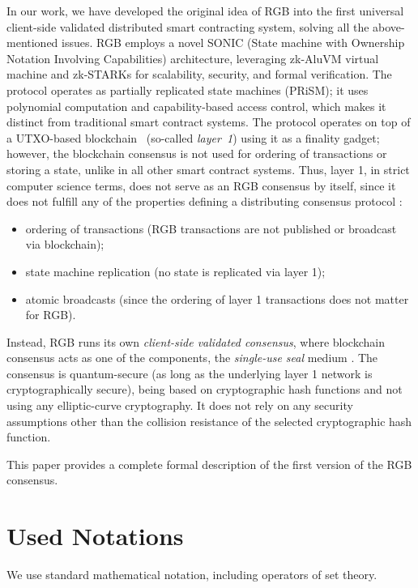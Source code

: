 \documentclass[9pt,oneside]{amsart}
\begin{document}
\begin{multicols}{2}
In our work, we have developed the original idea of RGB into the first universal
client-side validated distributed smart contracting system,
solving all the above-mentioned issues.
RGB employs a novel SONIC (State machine with Ownership Notation Involving Capabilities) architecture,
leveraging zk-AluVM virtual machine \cite{AluVM} and zk-STARKs \cite{zkSTARKs}
for scalability, security, and formal verification.
The protocol operates as partially replicated state machines (PRiSM);
it uses polynomial computation and capability-based access control,
which makes it distinct from traditional smart contract systems.
The protocol operates on top of a UTXO-based blockchain~\cite{UTXO}
(so-called \emph{layer~1}) using it as a finality gadget;
however, the blockchain consensus is not used for ordering of transactions or storing a state,
unlike in all other smart contract systems.
Thus, layer 1, in strict computer science terms,
does not serve as an RGB consensus by itself,
since it does not fulfill any of the properties defining
a distributing consensus protocol \cite{consensus}:
\noindent\nopagebreak
\begin{itemize}
    \item ordering of transactions (RGB transactions are not published or broadcast via blockchain);
    \item state machine replication (no state is replicated via layer 1);
    \item atomic broadcasts (since the ordering of layer 1 transactions does not matter for RGB).
\end{itemize}

Instead, RGB runs its own \emph{client-side validated consensus}, where blockchain consensus
acts as one of the components, the \emph{single-use seal} medium \cite{LNPBP8}.
The consensus is quantum-secure (as long as the underlying layer 1 network is cryptographically secure),
being based on cryptographic hash functions and not using any elliptic-curve cryptography.
It does not rely on any security assumptions other than the collision resistance of the selected
cryptographic hash function.

This paper provides a complete formal description of the first version of the RGB consensus.

\section{Used Notations}

We use standard mathematical notation, including operators of set theory.


\end{multicols}
\end{document}
